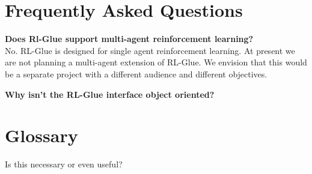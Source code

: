 \documentclass[11pt]{article}
\begin{document}
\section{Frequently Asked Questions}
\label{faq}
{\bf Does Rl-Glue support multi-agent reinforcement learning?}\\
 No. RL-Glue is designed for single agent reinforcement learning. At present we are not planning a multi-agent extension of RL-Glue. We envision that this would be a separate project with a different audience and different objectives.  
 
 {\bf Why isn't the RL-Glue interface object oriented?}\\
\section{Glossary}
\label{glos}
Is this necessary or even useful?
\end{document}
